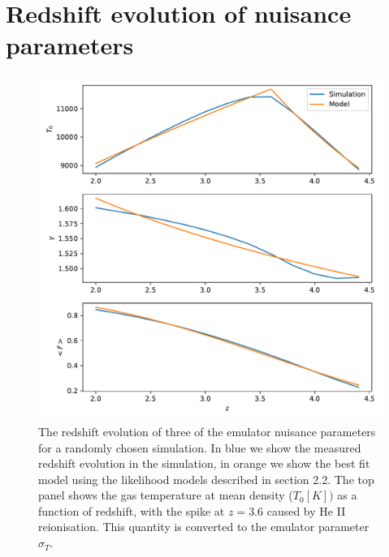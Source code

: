 \documentclass[]{article}
\begin{document}
\clearpage
\section{Redshift evolution of nuisance parameters}
\begin{figure}[h]
    \centering
    \includegraphics[scale=0.7]{Figures/512_sim2.pdf}
    \caption{The redshift evolution of three of the emulator nuisance parameters for a 
    randomly chosen simulation. In blue we show the measured redshift evolution in the 
    simulation, in orange we show the best fit model using the likelihood models 
    described in section 2.2. The top panel shows the gas temperature at mean density
    ($T_0 [K])$ as a function of redshift, with the spike at $z=3.6$ caused by He II
    reionisation. This quantity is converted to the emulator parameter $\sigma_T$.}
\end{figure}
\end{document}
